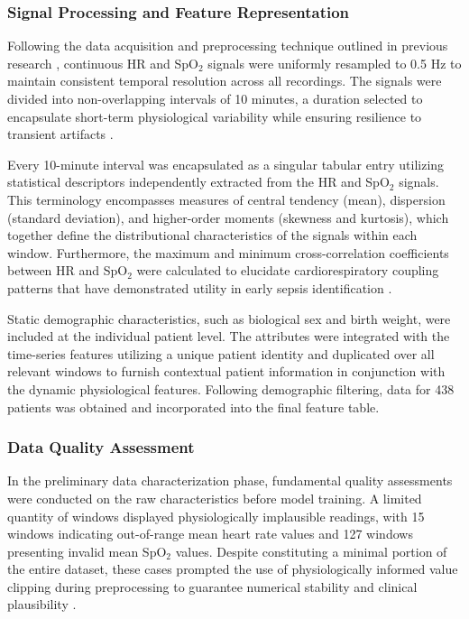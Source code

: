 \documentclass[conference]{IEEEtran}
\begin{document}
\subsubsection{Signal Processing and Feature Representation}
Following the data acquisition and preprocessing technique outlined in previous research \cite{Moorman2023CardiorespiratorySepsis}, continuous HR and SpO$_2$ signals were uniformly resampled to 0.5 Hz to maintain consistent temporal resolution across all recordings. The signals were divided into non-overlapping intervals of 10 minutes, a duration selected to encapsulate short-term physiological variability while ensuring resilience to transient artifacts \cite{hero_monitoring}.

Every 10-minute interval was encapsulated as a singular tabular entry utilizing statistical descriptors independently extracted from the HR and SpO$_2$ signals. This terminology encompasses measures of central tendency (mean), dispersion (standard deviation), and higher-order moments (skewness and kurtosis), which together define the distributional characteristics of the signals within each window. Furthermore, the maximum and minimum cross-correlation coefficients between HR and SpO$_2$ were calculated to elucidate cardiorespiratory coupling patterns that have demonstrated utility in early sepsis identification \cite{hero_monitoring,los_ml_mdpi}.

Static demographic characteristics, such as biological sex and birth weight, were included at the individual patient level. The attributes were integrated with the time-series features utilizing a unique patient identity and duplicated over all relevant windows to furnish contextual patient information in conjunction with the dynamic physiological features. Following demographic filtering, data for 438 patients was obtained and incorporated into the final feature table.

\subsubsection{Data Quality Assessment}
In the preliminary data characterization phase, fundamental quality assessments were conducted on the raw characteristics before model training. A limited quantity of windows displayed physiologically implausible readings, with 15 windows indicating out-of-range mean heart rate values and 127 windows presenting invalid mean SpO$_2$ values. Despite constituting a minimal portion of the entire dataset, these cases prompted the use of physiologically informed value clipping during preprocessing to guarantee numerical stability and clinical plausibility \cite{Saria2019SafeML}.
\end{document}
